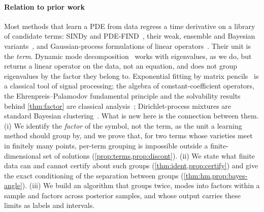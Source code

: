 \paragraph{Relation to prior work}
Most methods that learn a PDE from data regress a time derivative on a library of candidate terms: SINDy and
PDE-FIND~\cite{BruProKut16,RudBruProKut17}, their weak, ensemble and Bayesian variants~\cite{MesBor21,FasKutBru22,HirBarKut22},
and Gaussian-process formulations of linear operators~\cite{RaiPerKar17}. Their unit is the \emph{term}. Dynamic mode
decomposition~\cite{Sch10,SasKut22} works with eigenvalues, as we do, but returns a linear operator on the data, not an
equation, and does not group eigenvalues by the factor they belong to. Exponential fitting by matrix
pencils~\cite{HuaSar90} is a classical tool of signal processing; the algebra of constant-coefficient operators, the
Ehrenpreis--Palamodov fundamental principle and the solvability results behind \cref{thm:factor} are classical
analysis~\cite{Ehr70,Pal70,Mal56,Hor90,Obe90}; Dirichlet-process mixtures are standard Bayesian
clustering~\cite{BleJor06}. What is new here is the connection between them. (i) We identify the \emph{factor} of the
symbol, not the term, as the unit a learning method should group by, and we prove that, for two terms whose varieties meet in finitely many points, per-term grouping is impossible
outside a finite-dimensional set of solutions (\cref{prop:terms,prop:discont}). (ii) We state what finite data can and
cannot certify about such groups (\cref{thm:ident,prop:certify}) and give the exact conditioning of the
separation between groups (\cref{thm:hm,prop:bayes-angle}). (iii) We build an algorithm that groups twice, modes into
factors within a sample and factors across posterior samples, and whose output carries these limits as labels and
intervals.
